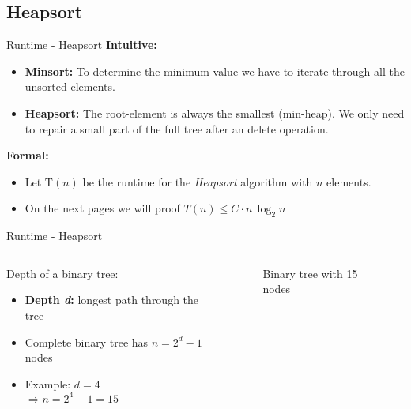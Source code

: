 \subsection{Heapsort}

\begin{frame}{Runtime - Heapsort}
  \textbf{Intuitive:}
  \begin{itemize}
    \item
      \textbf{Minsort:}
      To determine the minimum value we have to iterate through all the
      unsorted elements.
    \item
      \textbf{Heapsort:}
      The root-element is always the smallest (min-heap).
      We only need to repair a small part of the full tree after an delete
      operation.
  \end{itemize}
  \textbf{Formal:}
  \begin{itemize}
    \item 
    Let T$(n)$ be the runtime for the \textit{Heapsort}
    algorithm with $n$ elements.
    \item
    On the next pages we will proof $T(n) \leq C \cdot n \, \log_2 n$
  \end{itemize}
\end{frame}


\begin{frame}{Runtime - Heapsort}
  \begin{columns}
    \begin{column}{0.5\textwidth}
      Depth of a binary tree:
      \begin{itemize}
        \item
          \textbf{Depth \textit{d}:}
          longest path through the tree
        \item
          Complete binary tree has $n = 2^d - 1$ nodes
        \item
          Example: $d = 4$\\
          $\Rightarrow n = 2^4 - 1 = 15$
      \end{itemize}
    \end{column}
    \begin{column}{0.5\textwidth}
      \begin{figure}
        \begin{adjustbox}{width=\linewidth}
        \end{adjustbox}
        \caption{Binary tree with 15 nodes}%
        \label{fig:binary_tree}%
      \end{figure}
    \end{column}
  \end{columns}
\end{frame}
